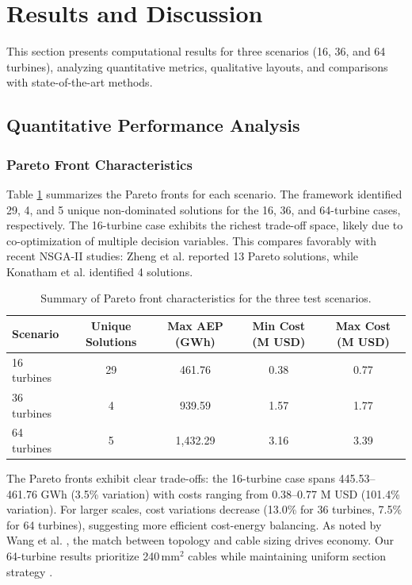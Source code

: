 \section{Results and Discussion}
\label{sec:results}

This section presents computational results for three scenarios (16, 36, and 64 turbines), analyzing quantitative metrics, qualitative layouts, and comparisons with state-of-the-art methods.

\subsection{Quantitative Performance Analysis}

\subsubsection{Pareto Front Characteristics}

Table \ref{tab:pareto_summary} summarizes the Pareto fronts for each scenario. The framework identified 29, 4, and 5 unique non-dominated solutions for the 16, 36, and 64-turbine cases, respectively. The 16-turbine case exhibits the richest trade-off space, likely due to co-optimization of multiple decision variables. This compares favorably with recent NSGA-II studies: Zheng et al. \cite{Zheng2025NSGA2} reported 13 Pareto solutions, while Konatham et al. \cite{Konatham2024NSGA2} identified 4 solutions.

\begin{table}[ht]
\caption{Summary of Pareto front characteristics for the three test scenarios.}
\label{tab:pareto_summary}
\centering
\begin{tabular}{@{}lcccc@{}}
\toprule
\textbf{Scenario} & \textbf{Unique Solutions} & \textbf{Max AEP (GWh)} & \textbf{Min Cost (M USD)} & \textbf{Max Cost (M USD)} \\
\midrule
16 turbines & 29 & 461.76 & 0.38 & 0.77 \\
36 turbines & 4 & 939.59 & 1.57 & 1.77 \\
64 turbines & 5 & 1,432.29 & 3.16 & 3.39 \\
\bottomrule
\end{tabular}
\end{table}

The Pareto fronts exhibit clear trade-offs: the 16-turbine case spans 445.53--461.76 GWh (3.5\% variation) with costs ranging from 0.38--0.77 M USD (101.4\% variation). For larger scales, cost variations decrease (13.0\% for 36 turbines, 7.5\% for 64 turbines), suggesting more efficient cost-energy balancing. As noted by Wang et al. \cite{Wang2019Integrated}, the match between topology and cable sizing drives economy. Our 64-turbine results prioritize 240\,mm$^2$ cables while maintaining uniform section strategy \cite{Jiang2025Review, Alencar2026Flexible}.

